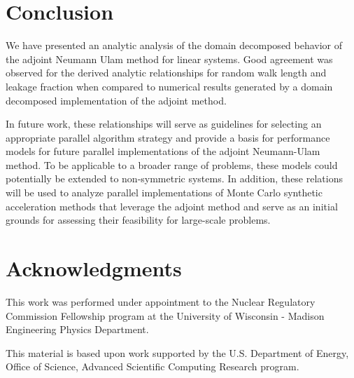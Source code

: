 \documentclass[preprint,11pt]{elsarticle}
\begin{document}
\section{Conclusion}

We have presented an analytic analysis of the domain decomposed
behavior of the adjoint Neumann Ulam method for linear systems. Good
agreement was observed for the derived analytic relationships for
random walk length and leakage fraction when compared to numerical
results generated by a domain decomposed implementation of the adjoint
method.

In future work, these relationships will serve as guidelines for
selecting an appropriate parallel algorithm strategy and provide a
basis for performance models for future parallel implementations of
the adjoint Neumann-Ulam method. To be applicable to a broader range
of problems, these models could potentially be extended to
non-symmetric systems. In addition, these relations will be used to
analyze parallel implementations of Monte Carlo synthetic acceleration
methods that leverage the adjoint method and serve as an initial
grounds for assessing their feasibility for large-scale problems.

\section{Acknowledgments}
This work was performed under appointment to the Nuclear Regulatory
Commission Fellowship program at the University of Wisconsin - Madison
Engineering Physics Department.

This material is based upon work supported by the U.S. Department of
Energy, Office of Science, Advanced Scientific Computing Research
program.

 
\end{document}
